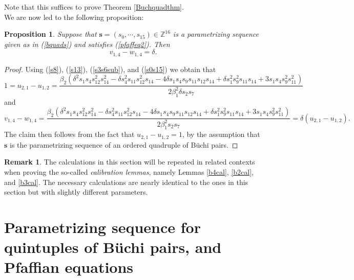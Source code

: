 \documentclass[letterpaper,10pt]{amsart}
\newcommand{\bZ}{{\mathbb{Z}}}
\newcommand{\Bs}{{\mathbf{s}}}
\newtheorem{proposition}[theorem]{Proposition}
\theoremstyle{definition}
\newtheorem{remark}[theorem]{Remark}
\numberwithin{equation}{section}
\begin{document}
Note that this suffices to prove Theorem \ref{Buchquadthm}. \\

We are now led to the following proposition: 

\begin{proposition} \label{quadprop} Suppose that $\Bs = (s_0, \cdots, s_{15}) \in \bZ^{16}$ is a parametrizing sequence given as in (\ref{bquads}) and satisfies (\ref{pfaffeq2}). Then 
\begin{equation} \label{pfaffeq3} v_{1,4} - w_{1,4} = \delta. \end{equation} 
\end{proposition} 

\begin{proof} Using (\ref{s8}), (\ref{s13}), (\ref{s3s6sub}), and (\ref{s0s15}) we obtain that 
\[1 = u_{2,1} - u_{1,2} = \frac{\beta_2(\delta^2 s_1 s_4 s_{12}^2 s_{14}^2  - \delta s_4^2 s_{11} s_{12}^2 s_{14}  - 4 \delta s_1 s_4 s_9 s_{11} s_{12}  s_{14} + \delta s_1^2 s_9^2 s_{11} s_{14} + 3 s_1 s_4 s_9^2 s_{11}^2) }{2 \beta_1^2 \delta s_2 s_7} \]
and 
\begin{equation} v_{1,4} - w_{1,4} = \frac{\beta_2(\delta^2 s_1 s_4 s_{12}^2 s_{14}^2  - \delta s_4^2 s_{11} s_{12}^2 s_{14}  - 4 \delta s_1 s_4 s_9 s_{11} s_{12}  s_{14} + \delta s_1^2 s_9^2 s_{11} s_{14} + 3 s_1 s_4 s_9^2 s_{11}^2) }{2 \beta_1^2 s_2 s_7} = \delta (u_{2,1} - u_{1,2}).
\end{equation}
The claim then follows from the fact that $u_{2,1} - u_{1,2} = 1$, by the assumption that $\Bs$ is the parametrizing sequence of an ordered quadruple of B\"{u}chi pairs. \end{proof} 

\begin{remark} The calculations in this section will be repeated in related contexts when proving the so-called \emph{calibration lemmas}, namely Lemmas \ref{b4cal}, \ref{b2cal}, and \ref{b3cal}. The necessary calculations are nearly identical to the ones in this section but with slightly different parameters. 
\end{remark}

\section{Parametrizing sequence for quintuples of B\"{u}chi pairs, and Pfaffian equations}
\label{quintuples} 
\end{document}
